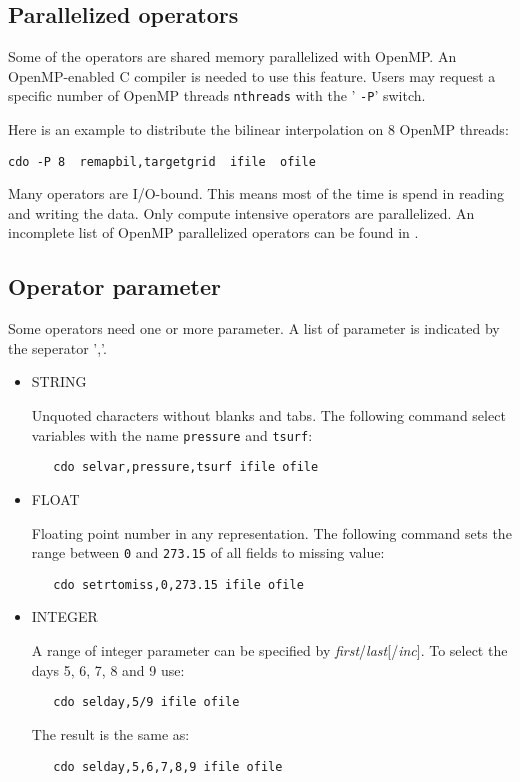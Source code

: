 \subsection{Parallelized operators}

Some of the {\CDO} operators are shared memory parallelized with OpenMP.
An OpenMP-enabled C compiler is needed to use this feature.
Users may request a specific number of OpenMP threads \texttt{nthreads} with the ' \texttt{-P}' switch.

Here is an example to distribute the bilinear interpolation on 8 OpenMP threads:
\begin{lstlisting}[frame=single, backgroundcolor=\color{pcolor2}, basicstyle=\ttfamily, columns=flexible]
   cdo -P 8  remapbil,targetgrid  ifile  ofile
\end{lstlisting}

Many {\CDO} operators are I/O-bound. This means most of the time is spend in reading and writing the data. 
Only compute intensive {\CDO} operators are parallelized. 
An incomplete list of OpenMP parallelized operators can be found in .

\subsection{Operator parameter}

Some operators need one or more parameter. A list of parameter is indicated by the seperator ','.

\begin{itemize}
\item STRING

Unquoted characters without blanks and tabs.
The following command select variables with the name \texttt{pressure} and \texttt{tsurf}:
\begin{verbatim}
   cdo selvar,pressure,tsurf ifile ofile
\end{verbatim}

\item FLOAT

Floating point number in any representation.
The following command sets the range between \texttt{0} and \texttt{273.15}
of all fields to missing value:
\begin{verbatim}
   cdo setrtomiss,0,273.15 ifile ofile
\end{verbatim}

\item INTEGER

A range of integer parameter can be specified by \textit{first}/\textit{last}[/\textit{inc}].
To select the days 5, 6, 7, 8 and 9 use:
\begin{verbatim}
   cdo selday,5/9 ifile ofile
\end{verbatim}
The result is the same as:
\begin{verbatim}
   cdo selday,5,6,7,8,9 ifile ofile
\end{verbatim}
\end{itemize}

